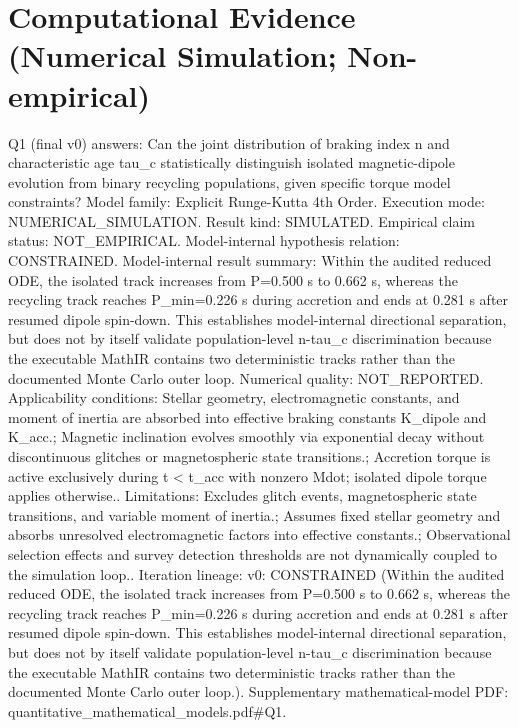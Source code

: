\documentclass[conference]{IEEEtran}
\begin{document}
\section{Computational Evidence (Numerical Simulation; Non-empirical)}
Q1 (final v0) answers: Can the joint distribution of braking index n and characteristic age tau\_c statistically distinguish isolated magnetic-dipole evolution from binary recycling populations, given specific torque model constraints? Model family: Explicit Runge-Kutta 4th Order. Execution mode: NUMERICAL\_SIMULATION. Result kind: SIMULATED. Empirical claim status: NOT\_EMPIRICAL. Model-internal hypothesis relation: CONSTRAINED. Model-internal result summary: Within the audited reduced ODE, the isolated track increases from P=0.500 s to 0.662 s, whereas the recycling track reaches P\_min=0.226 s during accretion and ends at 0.281 s after resumed dipole spin-down. This establishes model-internal directional separation, but does not by itself validate population-level n-tau\_c discrimination because the executable MathIR contains two deterministic tracks rather than the documented Monte Carlo outer loop. Numerical quality: NOT\_REPORTED. Applicability conditions: Stellar geometry, electromagnetic constants, and moment of inertia are absorbed into effective braking constants K\_dipole and K\_acc.; Magnetic inclination evolves smoothly via exponential decay without discontinuous glitches or magnetospheric state transitions.; Accretion torque is active exclusively during t < t\_acc with nonzero Mdot; isolated dipole torque applies otherwise.. Limitations: Excludes glitch events, magnetospheric state transitions, and variable moment of inertia.; Assumes fixed stellar geometry and absorbs unresolved electromagnetic factors into effective constants.; Observational selection effects and survey detection thresholds are not dynamically coupled to the simulation loop.. Iteration lineage: v0: CONSTRAINED (Within the audited reduced ODE, the isolated track increases from P=0.500 s to 0.662 s, whereas the recycling track reaches P\_min=0.226 s during accretion and ends at 0.281 s after resumed dipole spin-down. This establishes model-internal directional separation, but does not by itself validate population-level n-tau\_c discrimination because the executable MathIR contains two deterministic tracks rather than the documented Monte Carlo outer loop.). Supplementary mathematical-model PDF: quantitative\_mathematical\_models.pdf\#Q1.
\end{document}
